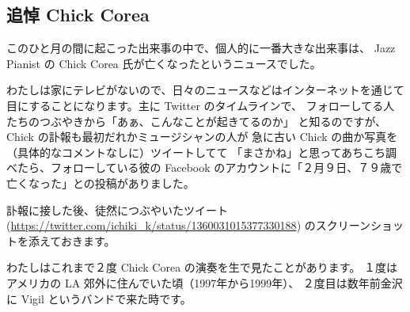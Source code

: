 \documentclass[dvipdfmx,autodetect-engine,10pt,b5paper,papersize,openany,dvipsnames]{jsbook}
\begin{document}
\begin{multicols}{2}

\section{追悼 Chick Corea}

\vspace{7.8cm}

このひと月の間に起こった出来事の中で、個人的に一番大きな出来事は、
Jazz Pianist の Chick Corea 氏が亡くなったというニュースでした。

わたしは家にテレビがないので、日々のニュースなどはインターネットを通じて
目にすることになります。主に Twitter のタイムラインで、
フォローしてる人たちのつぶやきから「あぁ、こんなことが起きてるのか」
と知るのですが、 Chick の訃報も最初だれかミュージシャンの人が
急に古い Chick の曲か写真を（具体的なコメントなしに）ツイートしてて
「まさかね」と思ってあちこち調べたら、フォローしている彼の Facebook
のアカウントに「２月９日、７９歳で亡くなった」との投稿がありました。

訃報に接した後、徒然につぶやいたツイート
(\url{https://twitter.com/ichiki_k/status/1360031015377330188})
のスクリーンショットを添えておきます。

わたしはこれまで２度 Chick Corea の演奏を生で見たことがあります。
１度はアメリカの LA 郊外に住んでいた頃（1997年から1999年）、
２度目は数年前金沢に Vigil というバンドで来た時です。


\end{multicols}
\end{document}
